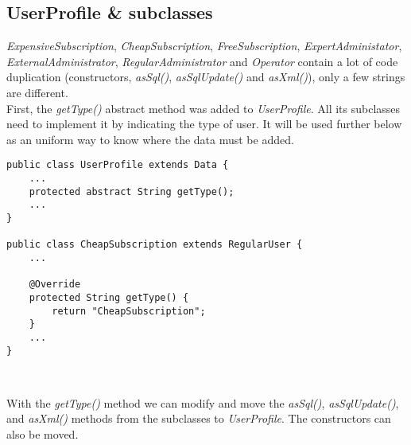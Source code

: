 \subsection{UserProfile \& subclasses}

\emph{ExpensiveSubscription}, \emph{CheapSubscription},
\emph{FreeSubscription}, \emph{ExpertAdministator},
\emph{ExternalAdministrator}, \emph{RegularAdministrator} and
\emph{Operator} contain a lot of code duplication (constructors,
\emph{asSql()}, \emph{asSqlUpdate()} and \emph{asXml()}), only a few strings
are different.\\

First, the \emph{getType()} abstract method was added to \emph{UserProfile}.
All its subclasses need to implement it by indicating the type of user.
It will be used further below as an uniform way to know where the data must be
added.\\

\begin{lstlisting}
public class UserProfile extends Data {
    ...
    protected abstract String getType();
    ...
}

public class CheapSubscription extends RegularUser {
    ...
    
    @Override
	protected String getType() {
		return "CheapSubscription";
	}
    ...
}
\end{lstlisting}
\

With the \emph{getType()} method we can modify and move the \emph{asSql()},
\emph{asSqlUpdate()}, and \emph{asXml()} methods from the subclasses to
\emph{UserProfile}. The constructors can also be moved.\\


